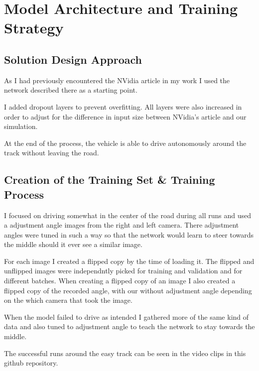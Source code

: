 \documentclass[12pt,a4paper]{article}
\begin{document}
\section{Model Architecture and Training Strategy}

\subsection{Solution Design Approach}

As I had previously encountered the NVidia article in my work I used the network described there as a starting point. 

I added dropout layers to prevent overfitting. All layers were also increased in order to adjust for the difference in input size between NVidia's article and our simulation.

At the end of the process, the vehicle is able to drive autonomously around the track without leaving the road.

\subsection{Creation of the Training Set \& Training Process}

I focused on driving somewhat in the center of the road during all runs and used a adjustment angle images from the right and left camera. There adjustment angles were tuned in such a way so that the network would learn to steer towards the middle should it ever see a similar image.

For each image I created a flipped copy by the time of loading it. The flipped and unflipped images were independntly picked for training and validation and for different batches. When creating a flipped copy of an image I also created a flipped copy of the recorded angle, with our without adjustment angle depending on the which camera that took the image.

When the model failed to drive as intended I gathered more of the same kind of data and also tuned to adjustment angle to teach the network to stay towards the middle.

The successful runs around the easy track can be seen in the video clips in this github repository.

{}

\end{document}
